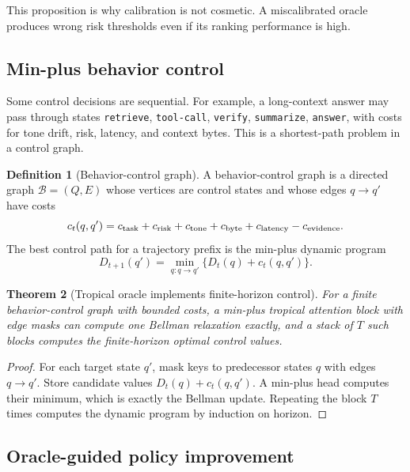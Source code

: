\documentclass[11pt]{article}
\newtheorem{theorem}{Theorem}[section]
\theoremstyle{definition}
\newtheorem{definition}[theorem]{Definition}
\theoremstyle{remark}
\numberwithin{equation}{section}
\begin{document}
This proposition is why calibration is not cosmetic.  A miscalibrated oracle produces wrong risk thresholds even if its ranking performance is high.

\subsection{Min-plus behavior control}

Some control decisions are sequential.  For example, a long-context answer may pass through states \texttt{retrieve}, \texttt{tool-call}, \texttt{verify}, \texttt{summarize}, \texttt{answer}, with costs for tone drift, risk, latency, and context bytes.  This is a shortest-path problem in a control graph.

\begin{definition}[Behavior-control graph]
A behavior-control graph is a directed graph \(\mathcal B=(Q,E)\) whose vertices are control states and whose edges \(q\to q'\) have costs
\begin{equation}
    c_t(q,q')=c_{\rm task}+c_{\rm risk}+c_{\rm tone}+c_{\rm byte}+c_{\rm latency}-c_{\rm evidence}.
\end{equation}
The best control path for a trajectory prefix is the min-plus dynamic program
\begin{equation}
    D_{t+1}(q')=\min_{q:q\to q'}\{D_t(q)+c_t(q,q')\}.
\end{equation}
\end{definition}

\begin{theorem}[Tropical oracle implements finite-horizon control]
For a finite behavior-control graph with bounded costs, a min-plus tropical attention block with edge masks can compute one Bellman relaxation exactly, and a stack of \(T\) such blocks computes the finite-horizon optimal control values.
\end{theorem}
\begin{proof}
For each target state \(q'\), mask keys to predecessor states \(q\) with edges \(q\to q'\).  Store candidate values \(D_t(q)+c_t(q,q')\).  A min-plus head computes their minimum, which is exactly the Bellman update.  Repeating the block \(T\) times computes the dynamic program by induction on horizon.
\end{proof}

\subsection{Oracle-guided policy improvement}
\end{document}
